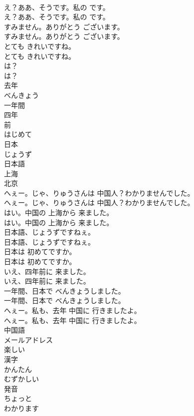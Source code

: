 \documentclass[8pt]{extreport}
\begin{document}
\begin{CJK}{UTF8}{min}
\\	え？ああ、そうです。私の です。	
\\	え？ああ、そうです。私の です。 
\\	すみません。ありがとう ございます。	
\\	すみません。ありがとう ございます。 
\\	とても きれいですね。	
\\	とても きれいですね。 
\\	は？	
\\	は？ 
\\	去年
\\	べんきょう
\\	一年間
\\	四年
\\	前
\\	はじめて
\\	日本
\\	じょうず
\\	日本語
\\	上海
\\	北京
\\	へぇー。じゃ、りゅうさんは 中国人？わかりませんでした。	
\\	へぇー。じゃ、りゅうさんは 中国人？わかりませんでした。 
\\	はい。中国の 上海から 来ました。	
\\	はい。中国の 上海から 来ました。 
\\	日本語、じょうずですねぇ。	
\\	日本語、じょうずですねぇ。 
\\	日本は 初めてですか。	
\\	日本は 初めてですか。 
\\	いえ、四年前に 来ました。	
\\	いえ、四年前に 来ました。 
\\	一年間、日本で べんきょうしました。	
\\	一年間、日本で べんきょうしました。 
\\	へぇー。私も、去年 中国に 行きましたよ。	
\\	へぇー。私も、去年 中国に 行きましたよ。 
\\	中国語
\\	メールアドレス
\\	楽しい
\\	漢字
\\	かんたん
\\	むずかしい
\\	発音
\\	ちょっと
\\	わかります

\end{CJK}
\end{document}
